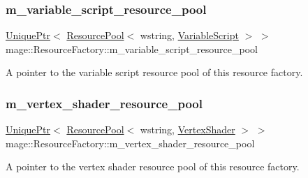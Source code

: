 \subsubsection{\texorpdfstring{m\+\_\+variable\+\_\+script\+\_\+resource\+\_\+pool}{m\_variable\_script\_resource\_pool}}
{\footnotesize\ttfamily \hyperlink{namespacemage_a8c307fbcc33bce9b7f2aa4c26c3b95cf}{Unique\+Ptr}$<$ \hyperlink{classmage_1_1_resource_pool}{Resource\+Pool}$<$ wstring, \hyperlink{classmage_1_1_variable_script}{Variable\+Script} $>$ $>$ mage\+::\+Resource\+Factory\+::m\+\_\+variable\+\_\+script\+\_\+resource\+\_\+pool\hspace{0.3cm}{\ttfamily [private]}}

A pointer to the variable script resource pool of this resource factory. \hypertarget{classmage_1_1_resource_factory_a9f961cc4c47821c9fadbac05b9b88c07}{}\label{classmage_1_1_resource_factory_a9f961cc4c47821c9fadbac05b9b88c07} 
\subsubsection{\texorpdfstring{m\+\_\+vertex\+\_\+shader\+\_\+resource\+\_\+pool}{m\_vertex\_shader\_resource\_pool}}
{\footnotesize\ttfamily \hyperlink{namespacemage_a8c307fbcc33bce9b7f2aa4c26c3b95cf}{Unique\+Ptr}$<$ \hyperlink{classmage_1_1_resource_pool}{Resource\+Pool}$<$ wstring, \hyperlink{classmage_1_1_vertex_shader}{Vertex\+Shader} $>$ $>$ mage\+::\+Resource\+Factory\+::m\+\_\+vertex\+\_\+shader\+\_\+resource\+\_\+pool\hspace{0.3cm}{\ttfamily [private]}}

A pointer to the vertex shader resource pool of this resource factory. 